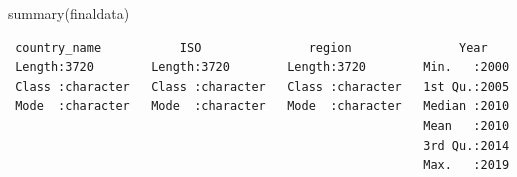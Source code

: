 \documentclass[
  letterpaper,
  DIV=11,
  numbers=noendperiod]{scrartcl}
\newenvironment{Shaded}{\begin{snugshade}}{\end{snugshade}}
\newcommand{\FunctionTok}[1]{\textcolor[rgb]{0.28,0.35,0.67}{#1}}
\newcommand{\NormalTok}[1]{\textcolor[rgb]{0.00,0.23,0.31}{#1}}
\begin{document}
\begin{Shaded}
\begin{Highlighting}[]
\FunctionTok{summary}\NormalTok{(finaldata)}
\end{Highlighting}
\end{Shaded}

\begin{verbatim}
 country_name           ISO               region               Year     
 Length:3720        Length:3720        Length:3720        Min.   :2000  
 Class :character   Class :character   Class :character   1st Qu.:2005  
 Mode  :character   Mode  :character   Mode  :character   Median :2010  
                                                          Mean   :2010  
                                                          3rd Qu.:2014  
                                                          Max.   :2019  
                                                                        

\end{verbatim}
\end{document}
